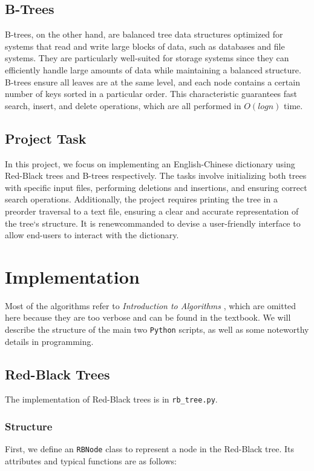 \documentclass[UTF8]{ctexart}
\begin{document}
\subsection{B-Trees}
B-trees, on the other hand, are balanced tree data structures optimized for systems 
that read and write large blocks of data, such as databases and file systems. 
They are particularly well-suited for storage systems since they can efficiently 
handle large amounts of data while maintaining a balanced structure. 
B-trees ensure all leaves are at the same level, and each node contains a certain number 
of keys sorted in a particular order. 
This characteristic guarantees fast search, insert, and delete operations, 
which are all performed in $O(log n)$ time.

\subsection{Project Task}
In this project, we focus on implementing an English-Chinese dictionary using Red-Black trees and B-trees respectively.
The tasks involve initializing both trees with specific input files, performing deletions 
and insertions, and ensuring correct search operations. 
Additionally, the project requires printing the tree in a preorder traversal 
to a text file, ensuring a clear and accurate representation of the tree`s structure.
It is renewcommanded to devise a user-friendly interface to allow end-users to interact with the dictionary.

\section{Implementation}
Most of the algorithms refer to \textit{Introduction to Algorithms} \cite{CLRS}, which are omitted here because they are too verbose and can be found in the textbook.
We will describe the structure of the main two \texttt{Python} scripts, as well as some noteworthy details in programming.

\subsection{Red-Black Trees}
The implementation of Red-Black trees is in \texttt{rb\_tree.py}.

\subsubsection*{Structure}
First, we define an \texttt{RBNode} class to represent a node in the Red-Black tree. Its attributes and 
typical functions are as follows:\\
\end{document}
